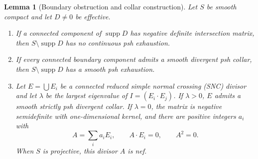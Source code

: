 \documentclass[11pt]{amsart}
\newtheorem{lemma}[theorem]{Lemma}
\theoremstyle{definition}
\theoremstyle{remark}
\numberwithin{equation}{section}
\newcommand{\supp}{\operatorname{supp}}
\begin{document}
\begin{lemma}[Boundary obstruction and collar construction]
\label{lem:surface-boundary-tools}
Let $S$ be smooth compact and let $D\ne0$ be effective.
\begin{enumerate}[label=\textup{(\roman*)},leftmargin=2.5em]
\item\label{item:negative-boundary}
If a connected component of $\supp D$ has negative definite
intersection matrix, then $S\setminus\supp D$ has no continuous psh
exhaustion.
\item\label{item:collar-gluing}
If every connected boundary component admits a smooth divergent psh
collar, then $S\setminus\supp D$ has a smooth psh exhaustion.
\item\label{item:matrix-alternatives}
Let $E=\bigcup E_i$ be a connected reduced simple normal crossing
\textup{(SNC)} divisor and let $\lambda$ be the largest eigenvalue of
$I=(E_i\cdot E_j)$. If $\lambda>0$, $E$ admits a smooth strictly psh
divergent collar. If $\lambda=0$, the matrix is negative semidefinite
with one-dimensional kernel, and there are positive integers $a_i$
with
\begin{equation}\label{eq:surface-null-boundary}
 A=\sum_i a_iE_i,\qquad A\cdot E_i=0,\qquad A^2=0.
\end{equation}
When $S$ is projective, this divisor $A$ is nef.
\end{enumerate}
\end{lemma}
\end{document}

